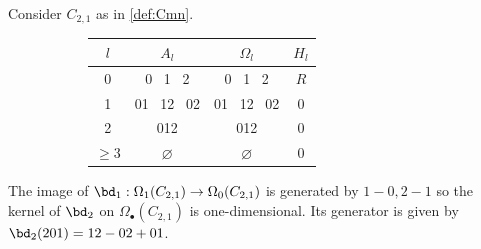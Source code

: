 \begin{example} \label{ex:commuting_triangle_homology}
Consider $C_{2,1}$ as in \cref{def:Cmn}.

 \begin{figure}[H]
        \centering
 \begin{subfigure}[c]{0.3\textwidth}
\end{subfigure}
\begin{subfigure}[c]{0.6\textwidth}
        \centering
    \begin{tabular}{||c||  c | c| c ||} 
 \hline
 $l$ &  $A_l$ & $\Omega_l$ & $H_l$ \\ [.5ex] 
 \hline\hline
0 &  0 \, 1 \, 2 & 0 \, 1 \, 2  & $R$\\ 
 \hline
 1 &  01 \, 12 \, 02 & 01 \, 12 \, 02 & 0  \\
 \hline
 2 & 012 & 012 & 0\\
 \hline
 $\geq 3$ & $\varnothing$ & $\varnothing$ & 0 \\
 \hline
\end{tabular} 
\end{subfigure}
    \end{figure}  
The image of $\bd_1:\Omega_1(C_{2,1}) \to \Omega_0(C_{2,1})$ is generated by $1-0, 2-1$ so the kernel of $\bd_2$ on $\Omega_\bullet (C_{2,1})$ is one-dimensional. Its generator is given by $\bd_2(201)=12-02+01$.
\end{example}

